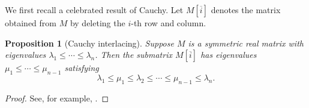 \documentclass[12pt]{amsart}
\newtheorem{prop}[thm]{Proposition}
\theoremstyle{definition}
\begin{document}
We first recall a celebrated result of Cauchy.
Let $M[\overline{i}]$ denotes the matrix obtained from $M$ by deleting the $i$-th row and column.

\begin{prop}[Cauchy interlacing]
\label{prop:cauchy-interlacing}
Suppose $M$ is a symmetric real matrix  with eigenvalues $\lambda_1 \leq \cdots \leq \lambda_n$. 
Then the submatrix $M[\overline{i}]$ has eigenvalues $\mu_1 \leq \cdots \leq \mu_{n-1}$ satisfying
\[
	\lambda_1 \leq \mu_1 \leq \lambda_2 \leq \cdots \leq \mu_{n-1} \leq \lambda_n.
\]
\end{prop}
\begin{proof}
See, for example, \cite[Theorem 4.3.17]{horn-johnson}.
\end{proof}
\end{document}
